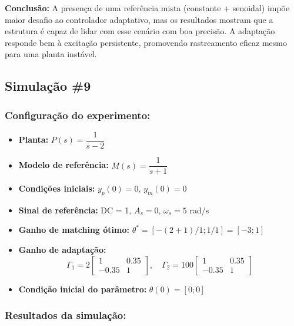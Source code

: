 \documentclass[10pt]{article}
\begin{document}
\textbf{Conclusão:} A presença de uma referência mista (constante + senoidal) impõe maior desafio ao controlador adaptativo, mas os resultados mostram que a estrutura é capaz de lidar com esse cenário com boa precisão. A adaptação responde bem à excitação persistente, promovendo rastreamento eficaz mesmo para uma planta instável.

\newpage

\subsection{Simulação \#9}
\subsubsection{Configuração do experimento:}
\begin{itemize}
\item \textbf{Planta:} $P(s) = \dfrac{1}{s - 2}$
\item \textbf{Modelo de referência:} $M(s) = \dfrac{1}{s + 1}$
\item \textbf{Condições iniciais:} $y_p(0)=0$, $y_m(0)=0$
\item \textbf{Sinal de referência:} DC = 1, $A_s=0$, $\omega_s=5$ rad/s
\item \textbf{Ganho de matching ótimo:} $\theta^* = [-(2+1)/1;1/1] = [-3;1]$
\item \textbf{Ganho de adaptação:} 
\[
\Gamma_1 = 2 \begin{bmatrix} 1 & 0.35 \\ -0.35 & 1 \end{bmatrix}, \quad
\Gamma_2 = 100 \begin{bmatrix} 1 & 0.35 \\ -0.35 & 1 \end{bmatrix}
\]
\item \textbf{Condição inicial do parâmetro:} $\theta(0) = [0;0]$
\end{itemize}

\subsubsection{Resultados da simulação:}
\end{document}
